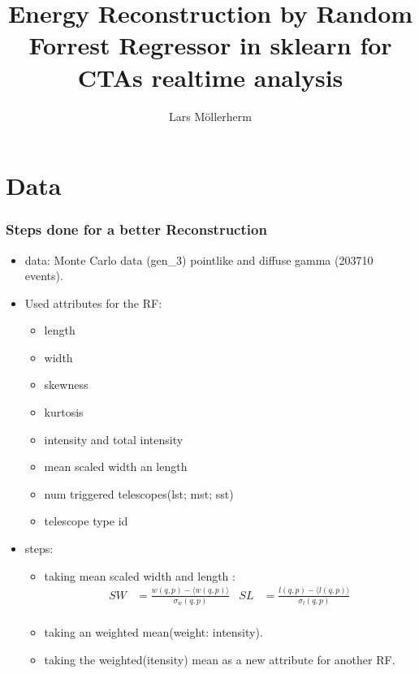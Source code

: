 \documentclass[aspectratio=1610, professionalfonts, 9pt]{beamer}
\title{Energy Reconstruction by Random Forrest Regressor in sklearn for CTAs
real\-time analysis}
\author[L.~Möllerherm]{Lars Möllerherm}
\institute[Experimentelle Physik Vb]{Experimentelle Physik Vb \\  Fakultät Physik}
\begin{document}
\maketitle

\section{Data}
  \begin{frame}
    \frametitle{Steps done for a better Reconstruction}
    \begin{itemize}
      \item data: Monte Carlo data (gen\_3) \- pointlike and diffuse gamma (203710 events).

      \item Used attributes for the RF:
      \begin{itemize}
        \item length
        \item width
        \item skewness
        \item kurtosis
        \item intensity and total intensity
        \item mean scaled width an length
        \item num triggered telescopes(lst; mst; sst)
        \item telescope type id
      \end{itemize}

      \item steps:
      \begin{itemize}
        \item taking mean scaled width and length  \cite[104]{HESS}:
        \begin{align*}
         SW &=\frac{w(q,p)-\langle w(q,p) \rangle}{\sigma_w(q,p)} & SL &= \frac{l(q,p)-\langle l(q,p) \rangle}{\sigma_l(q,p)} \\
        \end{align*}
        \item taking an weighted mean(weight: intensity).
        \item taking the weighted(itensity) mean as a new attribute for another RF.
      \end{itemize}
    \end{itemize}

  \end{frame}
\end{document}
